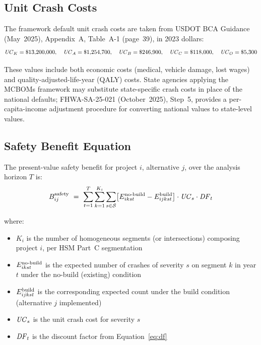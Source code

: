 \subsection{Unit Crash Costs}

The framework default unit crash costs are taken from USDOT BCA Guidance
(May~2025), Appendix~A, Table~A-1 (page~39), in 2023 dollars:
\begin{equation*}
\mathit{UC}_K = \$13{,}200{,}000, \quad
\mathit{UC}_A = \$1{,}254{,}700, \quad
\mathit{UC}_B = \$246{,}900, \quad
\mathit{UC}_C = \$118{,}000, \quad
\mathit{UC}_O = \$5{,}300
\end{equation*}

These values include both economic costs (medical, vehicle damage, lost wages)
and quality-adjusted-life-year (QALY) costs. State agencies applying the
MCBOMs framework may substitute state-specific crash costs in place of the
national defaults; FHWA-SA-25-021 (October~2025), Step~5, provides a
per-capita-income adjustment procedure for converting national values to
state-level values.

\subsection{Safety Benefit Equation}

The present-value safety benefit for project $i$, alternative $j$, over the
analysis horizon $T$ is:
\begin{equation}
\Bsafety_{ij}\ =\ \sum_{t=1}^{T}\sum_{k=1}^{K_i}\sum_{s \in \mathcal{S}}
  \bigl[\Enobuild_{ikst} - \Ebuild_{ijkst}\bigr] \cdot \UC_s \cdot \DF_t
\label{eq:safety-benefit}
\end{equation}

\noindent where:
\begin{itemize}[leftmargin=2em, itemsep=2pt]
  \item $K_i$ is the number of homogeneous segments (or intersections)
    composing project $i$, per HSM Part~C segmentation
  \item $E^{\mathrm{no\text{-}build}}_{ikst}$ is the expected number of crashes of severity $s$
    on segment $k$ in year $t$ under the no-build (existing) condition
  \item $E^{\mathrm{build}}_{ijkst}$ is the corresponding expected count under the build
    condition (alternative $j$ implemented)
  \item $\mathit{UC}_s$ is the unit crash cost for severity $s$
  \item $\mathit{DF}_t$ is the discount factor from Equation~\ref{eq:df}
\end{itemize}

